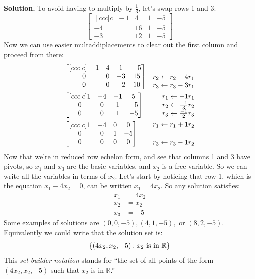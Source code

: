 \documentclass[11pt, letterpaper]{report}
\newenvironment{book}{}{}
\let\originalleft\left
\let\originalright\right
\renewcommand{\left}{\mathopen{}\mathclose\bgroup\originalleft}
\renewcommand{\right}{\aftergroup\egroup\originalright}
\newcounter{example}[section]
\newcommand{\R}{\mathbb{R}}
\begin{document}
\begin{book}
\textbf{Solution.} To avoid having to multiply by $\frac{1}{3}$, let's swap rows 1 and 3:
\[\begin{bmatrix}[ccc|c]
-1 & 4 & 1 & -5 \\
-4 & 16 & 1 & -5 \\
-3 & 12 & 1 & -5 
\end{bmatrix}\]
Now we can use easier multaddiplacements to clear out the first column and proceed from there:
\begin{align*}
&\begin{bmatrix}[ccc|c]
-1 & 4 & 1 & -5 \\
0 & 0 & -3 & 15 \\
0 & 0 & -2 & 10 
\end{bmatrix} &\begin{matrix}
\rule{0em}{1em} \\ r_2 \leftarrow r_2 -4r_1 \\ r_3 \leftarrow r_3-3r_1
\end{matrix} \\
&\begin{bmatrix}[ccc|c]
1 & -4 & -1 & 5 \\
0 & 0 & 1 & -5 \\
0 & 0 & 1 & -5 
\end{bmatrix} &\begin{matrix}
r_1 \leftarrow -1r_{1} \\ r_2 \leftarrow \frac{-1}{3}r_2 \\ r_3 \leftarrow \frac{-1}{2}r_3
\end{matrix} \\
&\begin{bmatrix}[ccc|c]
1 & -4 & 0 & 0 \\
0 & 0 & 1 & -5 \\
0 & 0 & 0 & 0 
\end{bmatrix} &\begin{matrix}
r_1 \leftarrow r_1+1r_2 \\ \rule{0em}{1em} \\ r_3 \leftarrow r_3 -1r_2
\end{matrix} 
\end{align*}
Now that we're in reduced row echelon form, and see that columns 1 and 3 have pivots, so $x_1$ and $x_3$ are the basic variables, and $x_2$ is a free variable. So we can write all the variables in terms of $x_2$. Let's start by noticing that row 1, which is the equation $x_1-4x_2=0$, can be written $x_1=4x_2$. So any solution satisfies:
\[\begin{aligned}
x_1&=4x_2 \\
x_2&=x_2 \\
x_3&=-5
\end{aligned}\]
Some examples of solutions are $(0,0,-5), (4,1,-5),$ or $(8,2,-5)$. Equivalently we could write that the solution set is:
\[\left\{ (4x_2,x_2,-5) : x_2 \text{ is in } \R\right\} \]
This \emph{set-builder notation} stands for ``the set of all points of the form $(4x_2,x_2,-5)$ such that $x_2$ is in $\R$.'' \blacksquare
\end{book}
\end{document}
